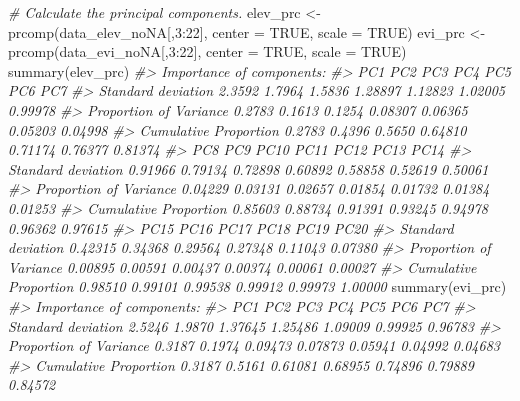 \documentclass[
]{article}
\newenvironment{Shaded}{\begin{snugshade}}{\end{snugshade}}
\newcommand{\AttributeTok}[1]{\textcolor[rgb]{0.77,0.63,0.00}{#1}}
\newcommand{\CommentTok}[1]{\textcolor[rgb]{0.56,0.35,0.01}{\textit{#1}}}
\newcommand{\ConstantTok}[1]{\textcolor[rgb]{0.00,0.00,0.00}{#1}}
\newcommand{\DecValTok}[1]{\textcolor[rgb]{0.00,0.00,0.81}{#1}}
\newcommand{\FunctionTok}[1]{\textcolor[rgb]{0.00,0.00,0.00}{#1}}
\newcommand{\NormalTok}[1]{#1}
\newcommand{\OtherTok}[1]{\textcolor[rgb]{0.56,0.35,0.01}{#1}}
\newcommand{\SpecialCharTok}[1]{\textcolor[rgb]{0.00,0.00,0.00}{#1}}
\begin{document}
\begin{Shaded}
\begin{Highlighting}[]
\CommentTok{\# Calculate the principal components.}
\NormalTok{elev\_prc }\OtherTok{\textless{}{-}} \FunctionTok{prcomp}\NormalTok{(data\_elev\_noNA[,}\DecValTok{3}\SpecialCharTok{:}\DecValTok{22}\NormalTok{], }\AttributeTok{center =} \ConstantTok{TRUE}\NormalTok{, }\AttributeTok{scale =} \ConstantTok{TRUE}\NormalTok{)}
\NormalTok{evi\_prc }\OtherTok{\textless{}{-}} \FunctionTok{prcomp}\NormalTok{(data\_evi\_noNA[,}\DecValTok{3}\SpecialCharTok{:}\DecValTok{22}\NormalTok{], }\AttributeTok{center =} \ConstantTok{TRUE}\NormalTok{, }\AttributeTok{scale =} \ConstantTok{TRUE}\NormalTok{)}
\FunctionTok{summary}\NormalTok{(elev\_prc)}
\CommentTok{\#\textgreater{} Importance of components:}
\CommentTok{\#\textgreater{}                           PC1    PC2    PC3     PC4     PC5     PC6     PC7}
\CommentTok{\#\textgreater{} Standard deviation     2.3592 1.7964 1.5836 1.28897 1.12823 1.02005 0.99978}
\CommentTok{\#\textgreater{} Proportion of Variance 0.2783 0.1613 0.1254 0.08307 0.06365 0.05203 0.04998}
\CommentTok{\#\textgreater{} Cumulative Proportion  0.2783 0.4396 0.5650 0.64810 0.71174 0.76377 0.81374}
\CommentTok{\#\textgreater{}                            PC8     PC9    PC10    PC11    PC12    PC13    PC14}
\CommentTok{\#\textgreater{} Standard deviation     0.91966 0.79134 0.72898 0.60892 0.58858 0.52619 0.50061}
\CommentTok{\#\textgreater{} Proportion of Variance 0.04229 0.03131 0.02657 0.01854 0.01732 0.01384 0.01253}
\CommentTok{\#\textgreater{} Cumulative Proportion  0.85603 0.88734 0.91391 0.93245 0.94978 0.96362 0.97615}
\CommentTok{\#\textgreater{}                           PC15    PC16    PC17    PC18    PC19    PC20}
\CommentTok{\#\textgreater{} Standard deviation     0.42315 0.34368 0.29564 0.27348 0.11043 0.07380}
\CommentTok{\#\textgreater{} Proportion of Variance 0.00895 0.00591 0.00437 0.00374 0.00061 0.00027}
\CommentTok{\#\textgreater{} Cumulative Proportion  0.98510 0.99101 0.99538 0.99912 0.99973 1.00000}
\FunctionTok{summary}\NormalTok{(evi\_prc)}
\CommentTok{\#\textgreater{} Importance of components:}
\CommentTok{\#\textgreater{}                           PC1    PC2     PC3     PC4     PC5     PC6     PC7}
\CommentTok{\#\textgreater{} Standard deviation     2.5246 1.9870 1.37645 1.25486 1.09009 0.99925 0.96783}
\CommentTok{\#\textgreater{} Proportion of Variance 0.3187 0.1974 0.09473 0.07873 0.05941 0.04992 0.04683}
\CommentTok{\#\textgreater{} Cumulative Proportion  0.3187 0.5161 0.61081 0.68955 0.74896 0.79889 0.84572}

\end{Highlighting}
\end{Shaded}
\end{document}
